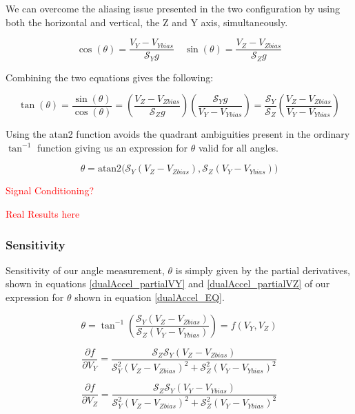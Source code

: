 \documentclass{article}
\newcommand{\xxx}[1]{\textcolor{red}{#1}}
\theoremstyle{plain}
\theoremstyle{definition}
\theoremstyle{remark}
\newcommand{\Sens}{\mathcal{S}}
\begin{document}
We can overcome the aliasing issue  presented in the two configuration by using both the horizontal and vertical, the Z and Y axis, simultaneously.  

$$ \cos(\theta) = \frac{V_Y-V_{Ybias}}{\Sens_{Y} g} \quad \sin(\theta) = \frac{V_{Z} - V_{Zbias}}{\Sens_{Z} g} $$

Combining the two equations gives the following:

$$ \tan(\theta) = \frac{\sin(\theta)}{\cos(\theta)} = \left(\frac{V_{Z} - V_{Zbias}}{\Sens_{Z} g}\right) \left( \frac{\Sens_{Y} g}{V_Y-V_{Ybias}} \right) = \frac{\Sens_{Y}}{\Sens_{Z}} \left( \frac{V_{Z} - V_{Zbias}}{V_{Y} - V_{Ybias}} \right)$$

Using the atan2 function avoids the quadrant ambiguities present in the ordinary $\tan^{-1}$ function giving us an expression for $\theta$ valid for all angles.

$$\theta = \text{atan2}\big( \Sens_{Y} \left( V_{Z} - V_{Zbias}\right),  \Sens_{Z} \left( V_{Y} - V_{Ybias}\right) \big)$$

\xxx{Signal Conditioning?}

\xxx{Real Results here}

\subsubsection{Sensitivity}

Sensitivity of our angle measurement, $\theta$ is simply given by the partial derivatives, shown in equations \ref{dualAccel_partialVY} and \ref{dualAccel_partialVZ} of our expression for $\theta$ shown in equation \ref{dualAccel_EQ}.

\begin{equation}
\theta = \tan^{-1} \left( \frac{\Sens_{Y} \left( V_{Z} - V_{Zbias}\right)}{\Sens_{Z} \left( V_{Y} - V_{Ybias}\right)} \right) = f(V_{Y},V_{Z})
\label{dualAccel_EQ}
\end{equation}

\begin{equation}
\frac{\partial f}{\partial V_{Y}} = \frac{\Sens_Z \Sens_Y \left(V_{Z} - V_{Zbias} \right)}{\Sens^2_Y \left(V_Z - V_{Zbias} \right) ^2 + \Sens^2_Z \left( V_Y - V_{Ybias}\right)^2}
\label{dualAccel_partialVY}
\end{equation}

\begin{equation}
\frac{\partial f }{\partial V_Z} = \frac{\Sens_Z \Sens_Y \left(V_{Y} - V_{Ybias} \right)}{\Sens^2_Y \left(V_Z - V_{Zbias} \right) ^2 + \Sens^2_Z \left( V_Y - V_{Ybias}\right)^2}
\label{dualAccel_partialVZ}
\end{equation}
\end{document}
